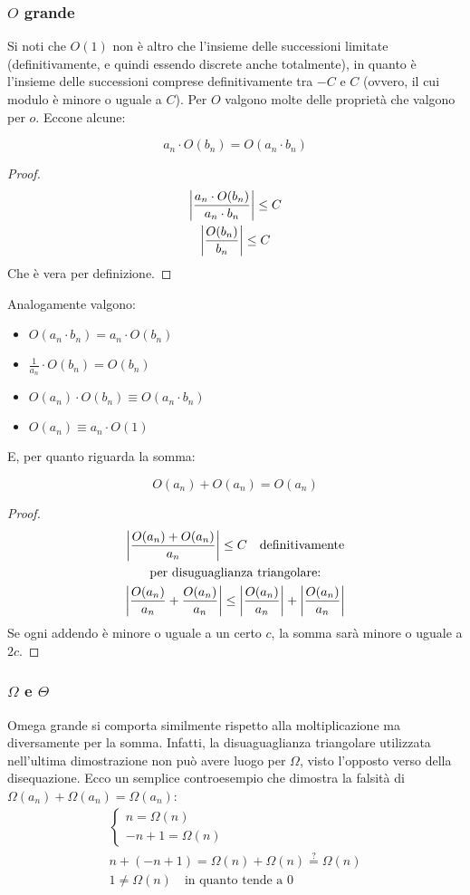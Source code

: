 \subsubsection{$O$ grande}
Si noti che $O(1)$ non è altro che l'insieme delle successioni limitate (definitivamente, e quindi essendo discrete anche totalmente), in quanto è l'insieme delle successioni comprese definitivamente tra $-C$ e $C$ (ovvero, il cui modulo è minore o uguale a $C$). Per $O$ valgono molte delle proprietà che valgono per $o$. Eccone alcune:
\begin{prop}
	\[
		a_n\cdot O(b_n)=O(a_n\cdot b_n)
	\]
\end{prop}
\begin{proof}
	\begin{gather*}
		\left\lvert \frac{a_n\cdot O(b_n)}{a_n\cdot b_n} \right\rvert\leq C\\
		\left\lvert \frac{O(b_n)}{b_n} \right\rvert\leq C
	\end{gather*}
	Che è vera per definizione.
\end{proof}
Analogamente valgono:
\begin{itemize}
	\item $O(a_n\cdot b_n)=a_n\cdot O(b_n)$
	\item $\frac{1}{a_n}\cdot O(b_n)=O(b_n)$
	\item $O(a_n)\cdot O(b_n)\equiv O(a_n\cdot b_n)$
	\item $O(a_n)\equiv a_n\cdot O(1)$
\end{itemize}
E, per quanto riguarda la somma:
\begin{prop}
	\[
		O(a_n)+O(a_n)=O(a_n)
	\]
\end{prop}
\begin{proof}
	\begin{gather*}
		\left\lvert \frac{O(a_n)+O(a_n)}{a_n} \right\rvert\leq C\quad\text{definitivamente}\\
		\text{per disuguaglianza triangolare:}\\
		\left\lvert \frac{O(a_n)}{a_n}+\frac{O(a_n)}{a_n} \right\rvert\leq \left\lvert \frac{O(a_n)}{a_n} \right\rvert+\left\lvert \frac{O(a_n)}{a_n} \right\rvert
	\end{gather*}
	Se ogni addendo è minore o uguale a un certo $c$, la somma sarà minore o uguale a $2c$.
\end{proof}


\subsubsection{$\Omega$ e $\Theta$}
Omega grande si comporta similmente rispetto alla moltiplicazione ma diversamente per la somma. Infatti, la disuaguaglianza triangolare utilizzata nell'ultima dimostrazione non può avere luogo per $\Omega$, visto l'opposto verso della disequazione. Ecco un semplice controesempio che dimostra la falsità di $\Omega(a_n)+\Omega(a_n)=\Omega(a_n)$:
\begin{gather*}
	\begin{cases}
		n=\Omega(n) \\
		-n+1=\Omega(n)
	\end{cases}\\
	n+(-n+1)=\Omega(n)+\Omega(n)\overset{?}{=}\Omega(n)\\
	1\neq\Omega(n)\quad\text{in quanto tende a $0$}
\end{gather*}


